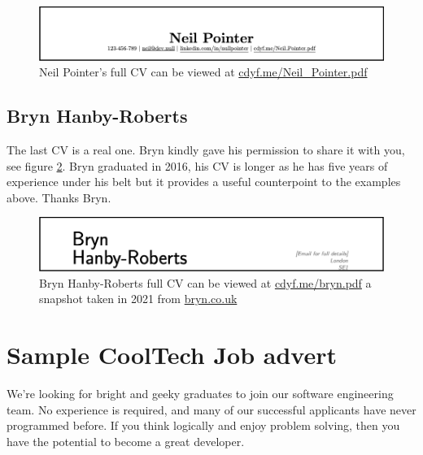 \documentclass[
]{book}
\begin{document}
\begin{figure}

{\centering \includegraphics[width=1\linewidth]{images/neil_pointer} 

}

\caption{Neil Pointer's full CV can be viewed at \href{https://www.cdyf.me/Neil_Pointer.pdf}{cdyf.me/Neil\_Pointer.pdf}}\label{fig:neilpointer-fig}
\end{figure}



\hypertarget{bryn}{%
\subsection{Bryn Hanby-Roberts}\label{bryn}}

The last CV is a real one. Bryn kindly gave his permission to share it with you, see figure \ref{fig:bryn-fig}. Bryn graduated in 2016, his CV is longer as he has five years of experience under his belt but it provides a useful counterpoint to the examples above. Thanks Bryn. 🙏

\begin{figure}

{\centering \includegraphics[width=1\linewidth]{images/bryn} 

}

\caption{Bryn Hanby-Roberts full CV can be viewed at \href{https://www.cdyf.me/bryn.pdf}{cdyf.me/bryn.pdf} a snapshot taken in 2021 from \href{http://bryn.co.uk}{bryn.co.uk}}\label{fig:bryn-fig}
\end{figure}



\hypertarget{cooltech}{%
\section{Sample CoolTech Job advert}\label{cooltech}}

We're looking for bright and geeky graduates to join our software engineering team. No experience is required, and many of our successful applicants have never programmed before. If you think logically and enjoy problem solving, then you have the potential to become a great developer.
\end{document}
